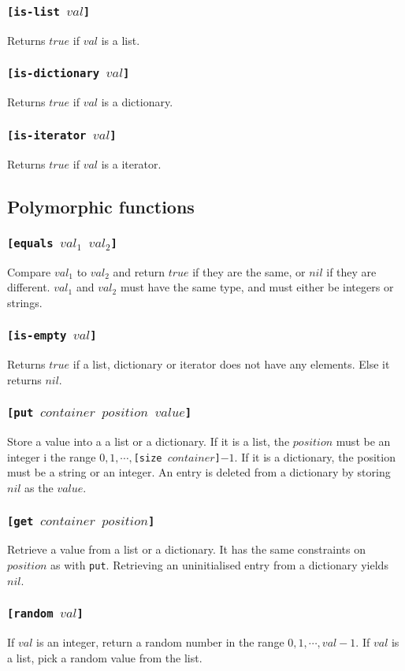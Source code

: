 \subsubsection{\tt{[is-list }$val$\tt{]}}
Returns $true$ if $val$ is a list.
\subsubsection{\tt{[is-dictionary }$val$\tt{]}}
Returns $true$ if $val$ is a dictionary.
\subsubsection{\tt{[is-iterator }$val$\tt{]}}
Returns $true$ if $val$ is a iterator.

\subsection{Polymorphic functions}
\subsubsection{\tt{[equals }$val_1$ $val_2$\tt{]}}
Compare $val_1$ to $val_2$ and return $true$ if they are the same, or $nil$ if they are different. $val_1$ and $val_2$ must have the same type, and must either be integers or strings.
\subsubsection{\tt{[is-empty }$val$\tt{]}}
Returns $true$ if a list, dictionary or iterator does not have any elements. Else it returns $nil$.
\subsubsection{\tt{[put }$container$ $position$ $value$\tt{]}}
Store a value into a a list or a dictionary. If it is a list, the $position$ must be an integer i the range $0,1, \cdots, ${\tt{[size }}$container${\tt{]}}$-1$.
If it is a dictionary, the position must be a string or an integer. An entry is deleted from a dictionary by storing $nil$ as the $value$.
\subsubsection{\tt{[get }$container$ $position$\tt{]}}
Retrieve a value from a list or a dictionary. It has the same constraints on $position$ as with \verb|put|. Retrieving an uninitialised entry from a dictionary yields $nil$.
\subsubsection{\tt{[random }$val$\tt{]}}
If $val$ is an integer, return a random number in the range $0,1, \cdots, val -1$. If $val$ is a list, pick a random value from the list.
